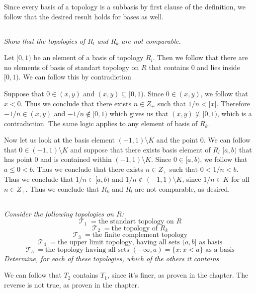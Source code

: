 \documentclass[11pt,oneside,titlepage]{book}
\DeclareMathOperator \topol {\mathcal {T}}
\newcommand{\set}[1]{\{ #1 \}}
\begin{document}
Since every basis of a topology is a subbasis by first clause of the definition, we follow
that the desired result holds for bases as well.

\subsection{}

\textit{Show that the topologies of $R_l$ and $R_k$ are not comparable.}

Let $[0, 1)$ be an element of a basis of topology $R_l$. Then we follow that
there are no elements of basis of standart topology on $R$ that contains $0$ and lies inside
$[0, 1)$. We can follow this by contradiction

Suppose that $0 \in (x, y)$ and $(x, y) \subseteq [0, 1)$. Since $0 \in (x, y) $,
we follow that $x < 0$. Thus we conclude that there exists $n \in Z_+$ such that
$1/n < |x|$. Therefore $-1/n \in (x, y)$ and $-1/n \notin [0, 1)$ which gives us
that $(x, y) \not \subseteq [0, 1)$, which is a contradiction.
The same logic applies to any element of basis of $R_k$.

Now let us look at the basis element $(-1, 1) \setminus K$ and the point $0$. We can
follow that $0 \in (-1, 1) \setminus K$ and suppose that there exists basis element of
$R_l$  $[a, b)$ that has point $0$ and is contained within $(-1, 1) \setminus K$.
Since $0 \in [a, b)$, we follow that $a \leq 0 < b$. Thus we conclude that there exists
$n \in Z_+$ such that $0 < 1/n < b$. Thus we conclude that $1/n \in [a, b)$ and
$1/n \notin (-1, 1) \setminus K$, since $1/n \in K$ for all $n \in Z_+$. Thus we
conclude that $R_k$ and $R_l$ are not comparable, as desired.

\subsection{}

\textit{Consider the following topologies on $R$:
  $$\topol_1 = \text{the standart topology on $R$}$$
  $$\topol_2 = \text{the topology of $R_k$}$$
  $$\topol_3 = \text{the finite complement topology}$$
  $$\topol_4 = \text{the upper limit topology, having all sets $(a, b]$ as basis}$$
  $$\topol_5 = \text{the topology having all sets
    $(-\infty, a) = \set{x: x < a}$ as a basis}$$
    Determine, for each of these topologies, which of the others it contains
}

We can follow that $T_2$ contains $T_1$, since it's finer, as proven in the chapter. The
reverse is not true, as proven in the chapter.
\end{document}
